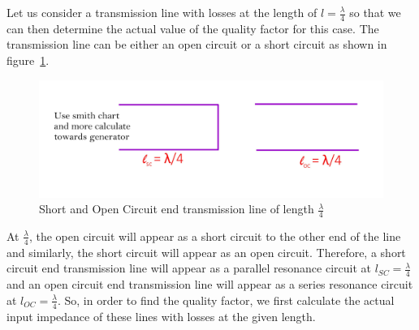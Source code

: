 


Let us consider a transmission line with losses at the length of $ l=\frac{\lambda}{4}$ so that we can then determine the actual value of the quality factor for this case. The transmission line can be either an open circuit or a short circuit as shown in figure~\ref{fig:fig1}.
\begin{figure}[h]
\centering
\includegraphics[width=1\linewidth]{./graphics/fig1}
\caption{Short and Open Circuit end transmission line of length $\frac{\lambda}{4}$}
\label{fig:fig1}
\end{figure}

At $ \frac{\lambda}{4} $, the open circuit will appear as a short circuit to the other end of the line and similarly, the short circuit will appear as an open circuit. Therefore, a short circuit end transmission line will appear as a parallel resonance circuit at $ l_{SC}=\frac{\lambda}{4} $ and an open circuit end transmission line will appear as a series resonance circuit at $ l_{OC}=\frac{\lambda}{4} $. So, in order to find the quality factor, we first calculate the actual input impedance of these lines with losses at the given length.

